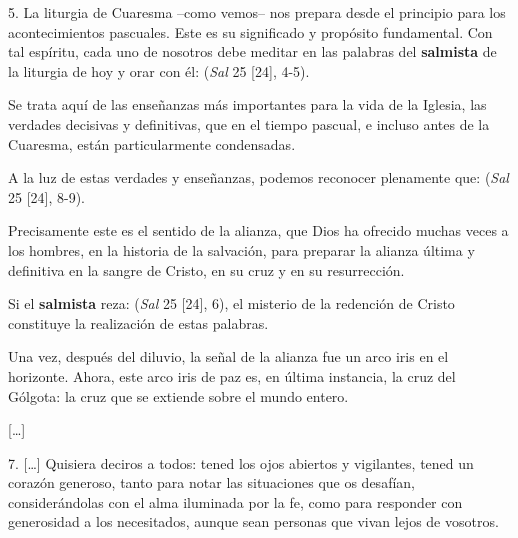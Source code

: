 \begin{body}
5. La liturgia de Cuaresma –como vemos– nos prepara desde el principio para los acontecimientos pascuales. Este es su significado y propósito fundamental. Con tal espíritu, cada uno de nosotros debe meditar en las palabras del \textbf{salmista} de la liturgia de hoy y orar con él:  (\textit{Sal} 25 [24], 4-5).

Se trata aquí de las enseñanzas más importantes para la vida de la Iglesia, las verdades decisivas y definitivas, que en el tiempo pascual, e incluso antes de la Cuaresma, están particularmente condensadas.

A la luz de estas verdades y enseñanzas, podemos reconocer plenamente que:  (\textit{Sal} 25 [24], 8-9).

Precisamente este es el sentido de la alianza, que Dios ha ofrecido muchas veces a los hombres, en la historia de la salvación, para preparar la alianza última y definitiva en la sangre de Cristo, en su cruz y en su resurrección.

Si el \textbf{salmista} reza:  (\textit{Sal} 25 [24], 6), el misterio de la redención de Cristo constituye la realización de estas palabras.

Una vez, después del diluvio, la señal de la alianza fue un arco iris en el horizonte. Ahora, este arco iris de paz es, en última instancia, la cruz del Gólgota: la cruz que se extiende sobre el mundo entero.

[\ldots]

7. [\ldots] Quisiera deciros a todos: tened los ojos abiertos y vigilantes, tened un corazón generoso, tanto para notar las situaciones que os desafían, considerándolas con el alma iluminada por la fe, como para responder con generosidad a los necesitados, aunque sean personas que vivan lejos de vosotros. 



\end{body}
